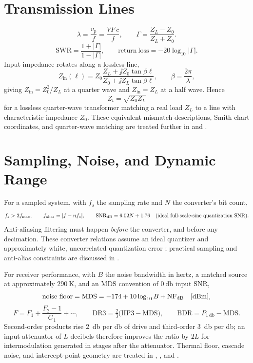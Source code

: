 \section{Transmission Lines}
\[
\lambda=\frac{v_p}{f}=\frac{VF\,c}{f},
\qquad
\Gamma=\frac{Z_L-Z_0}{Z_L+Z_0}.
\]
\[
\mathrm{SWR}=\frac{1+|\Gamma|}{1-|\Gamma|},
\qquad
\mathrm{return\ loss}=-20\log_{10}|\Gamma|.
\]
Input impedance rotates along a lossless line,
\[
Z_{\mathrm{in}}(\ell)=Z_0\frac{Z_L+\jj Z_0\tan\beta\ell}{Z_0+\jj Z_L\tan\beta\ell},
\qquad
\beta=\frac{2\pi}{\lambda},
\]
giving \(Z_{\mathrm{in}}=Z_0^2/Z_L\) at a quarter wave and \(Z_{\mathrm{in}}=Z_L\)
at a half wave. Hence
\[
Z_t=\sqrt{Z_0Z_L}
\]
for a lossless quarter-wave transformer matching a real load \(Z_L\) to a line
with characteristic impedance \(Z_0\). These equivalent mismatch descriptions,
Smith-chart coordinates, and quarter-wave matching are treated further in
\cite[pp.~78--152]{white2004highfrequency} and
\cite[pp.~1--25, 63--64]{free2022rfmicrowave}.

\section{Sampling, Noise, and Dynamic Range}
For a sampled system, with \(f_s\) the sampling rate and \(N\) the converter's bit
count,
\[
f_s>2f_{\max},
\qquad
f_{\text{alias}}=|f-nf_s|,
\qquad
\mathrm{SNR}_{\mathrm{dB}}=6.02N+1.76
\quad\text{(ideal full-scale-sine quantization SNR)}.
\]
Anti-aliasing filtering must happen \emph{before} the converter, and before any
decimation. These converter relations assume an ideal quantizer and approximately
white, uncorrelated quantization error
\cite[p.~188]{vankka2005synthesizers}; practical sampling and anti-alias constraints
are discussed in \cite[pp.~23--25, 39--40]{giannini2008baseband}.

For receiver performance, with \(B\) the noise bandwidth in hertz, a matched source
at approximately \(\SI{290}{\kelvin}\), and an MDS convention of
\(\SI{0}{\decibel}\) input SNR,
\[
\text{noise floor}=\mathrm{MDS}=-174+10\log_{10}B+\mathrm{NF}_{\mathrm{dB}}\quad[\mathrm{dBm}],
\]
\[
F=F_1+\frac{F_2-1}{G_1}+\cdots,
\qquad
\mathrm{DR3}=\tfrac{2}{3}\bigl(\mathrm{IIP3}-\mathrm{MDS}\bigr),
\qquad
\mathrm{BDR}=P_{\SI{1}{\decibel}}-\mathrm{MDS}.
\]
Second-order products rise \SI{2}{\decibel} per \si{\decibel} of drive and
third-order \SI{3}{\decibel} per \si{\decibel}; an input attenuator of \(L\) decibels
therefore improves the ratio by \(2L\) for intermodulation generated in stages after
the attenuator. Thermal floor, cascade noise, and intercept-point geometry are treated
in \cite[pp.~48--49, 89--103, 137--139]{egan2003practical},
\cite[pp.~257--263]{weber2001microwave}, and
\cite[pp.~435--438]{white2004highfrequency}.


